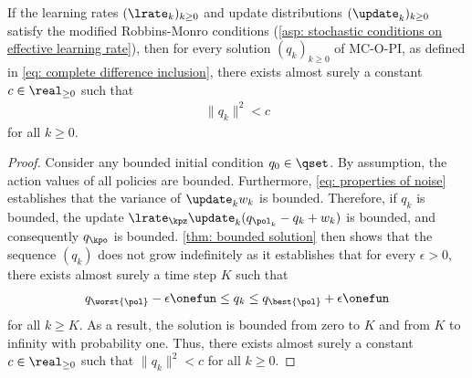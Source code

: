 \begin{corollary}
\label{thm: solution of mcopi is bounded}
    If the learning rates $(\lrate_k)_{k \geq 0}$ and update distributions $(\update_k)_{k \geq 0}$ satisfy the modified Robbins-Monro conditions (\autoref{asp: stochastic conditions on effective learning rate}),
    then for every solution $(q_k)_{k \geq 0}$ of MC-O-PI, as defined in \eqref{eq: complete difference inclusion}, there exists almost surely a constant $c \in \real_{\geq 0}$ such that
    \begin{align}
        \| q_k \|^2 < c
    \end{align}
    for all $k \geq 0$.
\end{corollary}
\begin{proof}
    Consider any bounded initial condition $q_0 \in \qset$.
    By assumption, the action values of all policies are bounded.
    Furthermore, \autoref{eq: properties of noise} establishes that the variance of $\update_k w_k$ is bounded.
    Therefore, if $q_k$ is bounded, the update $\lrate_\kpz \update_k ( q_{\pol_k} - q_k + w_k )$ is bounded, and consequently $q_\kpo$ is bounded.
    \autoref{thm: bounded solution} then shows that the sequence $(q_k)$ does not grow indefinitely as it establishes that for every $\epsilon>0$, there exists almost surely a time step $K$ such that
    \begin{align*}
        q_{\worst{\pol}} - \epsilon \onefun \leq q_k \leq q_{\best{\pol}} + \epsilon \onefun 
    \end{align*}
    for all $k \geq K$.
    As a result, the solution is bounded from zero to $K$ and from $K$ to infinity with probability one.
    Thus, there exists almost surely a constant $c \in \real_{\geq 0}$ such that $\| q_k \|^2 < c$
    for all $k \geq 0$.
\end{proof}